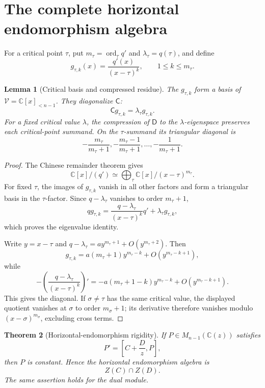 \documentclass[11pt]{article}
\numberwithin{equation}{section}
\newtheorem{theorem}{Theorem}[section]
\newtheorem{lemma}[theorem]{Lemma}
\theoremstyle{definition}
\theoremstyle{remark}
\newcommand{\C}{\mathbb C}
\newcommand{\ord}{\operatorname{ord}}
\newcommand{\Vcal}{\mathscr V}
\begin{document}
\section{The complete horizontal endomorphism algebra}

For a critical point $\tau$, put
$m_\tau=\ord_\tau q'$ and $\lambda_\tau=q(\tau)$, and define
\[
  g_{\tau,k}(x)=\frac{q'(x)}{(x-\tau)^k},
  \qquad 1\le k\le m_\tau.
\]

\begin{lemma}[Critical basis and compressed residue]\label{lem:critical-full}
The $g_{\tau,k}$ form a basis of $\Vcal=\C[x]_{<n-1}$.  They diagonalize
$\mathsf C$:
\[
  \mathsf Cg_{\tau,k}=\lambda_\tau g_{\tau,k}.
\]
For a fixed critical value $\lambda$, the compression of $\mathsf D$ to the
$\lambda$-eigenspace preserves each critical-point summand.  On the
$\tau$-summand its triangular diagonal is
\[
  -\frac{m_\tau}{m_\tau+1},
  -\frac{m_\tau-1}{m_\tau+1},\ldots,
  -\frac1{m_\tau+1}.
\]
\end{lemma}

\begin{proof}
The Chinese remainder theorem gives
\[
  \C[x]/(q')\simeq
  \bigoplus_\tau\C[x]/(x-\tau)^{m_\tau}.
\]
For fixed $\tau$, the images of $g_{\tau,k}$ vanish in all other factors and
form a triangular basis in the $\tau$-factor.  Since
$q-\lambda_\tau$ vanishes to order $m_\tau+1$,
\[
  qg_{\tau,k}
  =\frac{q-\lambda_\tau}{(x-\tau)^k}q'
   +\lambda_\tau g_{\tau,k},
\]
which proves the eigenvalue identity.

Write $y=x-\tau$ and
$q-\lambda_\tau=ay^{m_\tau+1}+O(y^{m_\tau+2})$.  Then
\[
  g_{\tau,k}=a(m_\tau+1)y^{m_\tau-k}+O(y^{m_\tau-k+1}),
\]
while
\[
 -\left(\frac{q-\lambda_\tau}{(x-\tau)^k}\right)'
 =-a(m_\tau+1-k)y^{m_\tau-k}+O(y^{m_\tau-k+1}).
\]
This gives the diagonal.  If $\sigma\ne\tau$ has the same critical value,
the displayed quotient vanishes at $\sigma$ to order $m_\sigma+1$; its
derivative therefore vanishes modulo $(x-\sigma)^{m_\sigma}$, excluding
cross terms.
\end{proof}

\begin{theorem}[Horizontal-endomorphism rigidity]
\label{thm:full-endomorphism}
If $P\in M_{n-1}(\C(z))$ satisfies
\[
  P'=\left[C+\frac Dz,P\right],
\]
then $P$ is constant.  Hence the horizontal endomorphism algebra is
\[
  Z(C)\cap Z(D).
\]
The same assertion holds for the dual module.
\end{theorem}
\end{document}
